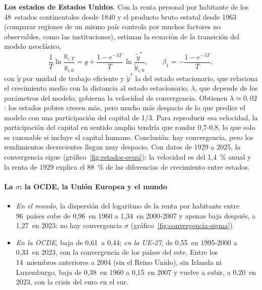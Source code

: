 \documentclass[11pt]{article}
\begin{document}
\begin{anotaciones}
\textbf{Los estados de Estados Unidos}\nocite{BarroSalaiMartin1992}. Con la renta personal por habitante de los 48~estados continentales desde 1840 y el producto bruto estatal desde 1963 (comparar regiones de un mismo país controla por muchos factores no observables, como las instituciones), estiman la ecuación de la transición del modelo neoclásico,
\begin{equation}
\frac{1}{T}\ln\frac{y_{i,T}}{y_{i,0}}=g+\frac{1-e^{-\lambda T}}{T}\,\ln\frac{\tilde y^*}{\tilde y_{i,0}},\qquad \beta_1=-\frac{1-e^{-\lambda T}}{T},\label{eq:bsm}
\end{equation}
con $\tilde y$ por unidad de trabajo eficiente y $\tilde y^*$ la del estado estacionario, que relaciona el crecimiento medio con la distancia al estado estacionario; $\lambda$, que depende de los parámetros del modelo, gobierna la velocidad de convergencia. Obtienen $\lambda\simeq0{,}02$: los estados pobres crecen más, pero mucho más despacio de lo que predice el modelo con una participación del capital de 1/3. Para reproducir esa velocidad, la participación del capital en sentido amplio tendría que rondar 0,7-0,8, lo que solo es razonable si incluye el capital humano. Conclusión: hay convergencia, pero los rendimientos decrecientes llegan muy despacio. Con datos de 1929 a 2025, la convergencia sigue (gráfico~\ref{fig:estados-eeuu}): la velocidad es del 1,4~\% anual y la renta de 1929 explica el 88~\% de las diferencias de crecimiento entre estados\nocite{BEA2026SAINC}.
\begin{figuracaja}
\caption{Los 48~estados continentales de Estados Unidos: renta personal por habitante en 1929 y crecimiento medio anual, 1929-2025}\label{fig:estados-eeuu}
\end{figuracaja}
\end{anotaciones}
\paragraph{La $\sigma$: la OCDE, la Unión Europea y el mundo}

\begin{itemize}
\item \emph{En el mundo}, la dispersión del logaritmo de la renta por habitante entre 96~países sube de 0,96~en 1960 a 1,34~en 2000-2007 y apenas baja después, a 1,27~en 2023: no hay convergencia $\sigma$ (gráfico~\ref{fig:convergencia-sigma})\nocite{GGDC2025PWT}.
\item \emph{En la OCDE}, baja de 0,61~a 0,44; \emph{en la UE-27}, de 0,55~en 1995-2000 a 0,33~en 2023, con la convergencia de los países del este. Entre los 14~miembros anteriores a 2004 (sin el Reino Unido), sin Irlanda ni Luxemburgo, baja de 0,38~en 1960 a 0,15~en 2007 y vuelve a subir, a 0,20~en 2023, con la crisis del euro en el sur\nocite{GGDC2025PWT}.
\end{itemize}
\end{document}
